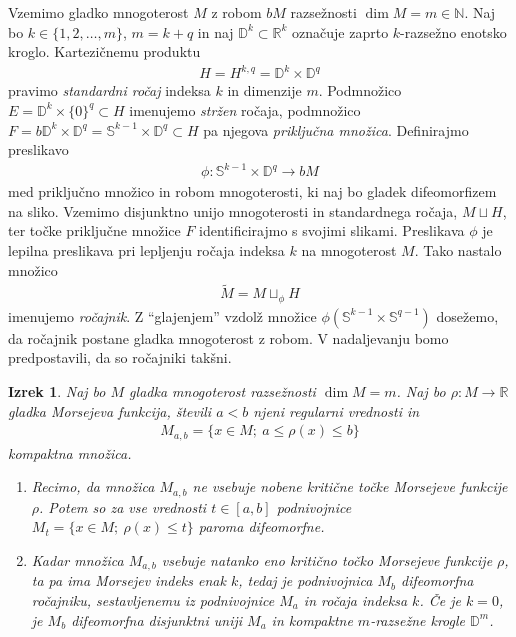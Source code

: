 \documentclass[12pt,a4paper,twoside]{article}
\theoremstyle{definition} %
\theoremstyle{plain} %
\newtheorem{izrek}[definicija]{Izrek}
\numberwithin{equation}{section}  %
\begin{document}
Vzemimo gladko mnogoterost $M$ z robom $bM$ razsežnosti $\dim M = m \in \mathbb{N}$.
Naj bo $k \in \{1, 2, \dots , m\}$, $m = k+q$ in naj $\mathbb{D}^{k} \subset \mathbb{R}^{k}$ označuje zaprto $k$-razsežno enotsko kroglo. Kartezičnemu produktu
\begin{gather*}
H = H^{k,q} = \mathbb{D}^{k} \times \mathbb{D}^{q}
\end{gather*}
pravimo \emph{standardni ročaj} indeksa $k$ in dimenzije $m$. Podmnožico $E = \mathbb{D}^{k} \times \{0\}^{q} \subset H$ imenujemo \emph{stržen} ročaja, podmnožico $F = b\mathbb{D}^{k} \times \mathbb{D}^{q} = \mathbb{S}^{k-1} \times \mathbb{D}^{q} \subset H$ pa njegova \emph{priključna množica}. \newline
Definirajmo preslikavo
\begin{gather*}
\phi \colon \mathbb{S}^{k-1} \times \mathbb{D}^{q} \to bM
\end{gather*}
med priključno množico in robom mnogoterosti, ki naj bo gladek difeomorfizem na sliko. Vzemimo disjunktno unijo mnogoterosti in standardnega ročaja, $M \sqcup H$, ter točke priključne množice $F$ identificirajmo s svojimi slikami. Preslikava $\phi$ je lepilna preslikava pri lepljenju ročaja indeksa $k$ na mnogoterost $M$. Tako nastalo množico 
\begin{gather*}
\widetilde{M} = M \sqcup_{\phi} H
\end{gather*}
imenujemo \emph{ročajnik}.
Z ``glajenjem'' vzdolž množice $\phi(\mathbb{S}^{k-1} \times \mathbb{S}^{q-1})$ dosežemo, da ročajnik postane gladka mnogoterost z robom. V nadaljevanju bomo predpostavili, da so ročajniki takšni.

\begin{izrek} \label{izr:rocajnik}
Naj bo $M$ gladka mnogoterost razsežnosti $\dim M= m$. Naj bo $\rho \colon M \to \mathbb{R}$ gladka Morsejeva funkcija, števili $a<b$ njeni regularni vrednosti in
\begin{gather*}
M_{a,b} = \{ x \in M; \ a \leq \rho(x) \leq b \}
\end{gather*}
kompaktna množica.
\begin{enumerate}
\item Recimo, da množica $M_{a,b}$ ne vsebuje nobene kritične točke Morsejeve funkcije $\rho$. Potem so za vse vrednosti $t \in [a,b]$ podnivojnice 
	$M_{t} = \{ x \in M; \ \rho(x) \leq t \}$ paroma difeomorfne.
\item Kadar množica $M_{a,b}$ vsebuje natanko eno kritično točko Morsejeve funkcije $\rho$, ta pa ima Morsejev indeks enak $k$, tedaj je podnivojnica 
	$M_{b}$ difeomorfna ročajniku, sestavljenemu iz podnivojnice $M_{a}$ in ročaja indeksa $k$.
	Če je $k=0$, je $M_{b}$ difeomorfna disjunktni uniji $M_{a}$ in kompaktne $m$-razsežne krogle $\mathbb{D}^{m}$.
\end{enumerate}
\end{izrek}
\end{document}
